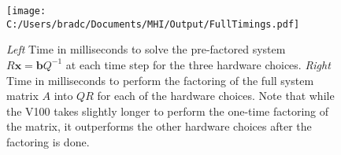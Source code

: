 \documentclass[11pt,letterpaper]{article}
\begin{document}
\begin{figure}[!ht]
    \centering
    \texttt{[image: C:/Users/bradc/Documents/MHI/Output/FullTimings.pdf]}
    \caption{\emph{Left} Time in milliseconds to solve the pre-factored system $R\mathbf{x} = \mathbf{b}Q^{-1}$ at each
    time step for the three hardware choices. \emph{Right} Time in milliseconds to perform the factoring of
    the full system matrix $A$ into $QR$ for each of the hardware choices. Note that while the V100 takes
    slightly longer to perform the one-time factoring of the matrix, it outperforms the other hardware 
    choices after the factoring is done.}
    \label{f:full_timings}
\end{figure}
\end{document}
